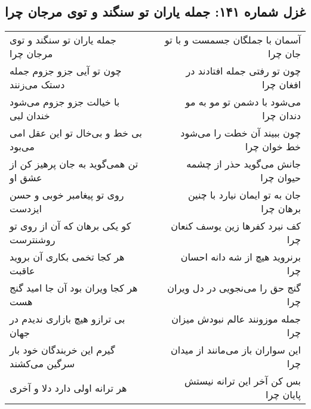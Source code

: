 \begin{center}
\section*{غزل شماره ۱۴۱: جمله یاران تو سنگند و توی مرجان چرا}
\label{sec:0141}
\begin{longtable}{l p{0.5cm} r}
جمله یاران تو سنگند و توی مرجان چرا
&&
آسمان با جملگان جسمست و با تو جان چرا
\\
چون تو آیی جزو جزوم جمله دستک می‌زنند
&&
چون تو رفتی جمله افتادند در افغان چرا
\\
با خیالت جزو جزوم می‌شود خندان لبی
&&
می‌شود با دشمن تو مو به مو دندان چرا
\\
بی خط و بی‌خال تو این عقل امی می‌بود
&&
چون ببیند آن خطت را می‌شود خط خوان چرا
\\
تن همی‌گوید به جان پرهیز کن از عشق او
&&
جانش می‌گوید حذر از چشمه حیوان چرا
\\
روی تو پیغامبر خوبی و حسن ایزدست
&&
جان به تو ایمان نیارد با چنین برهان چرا
\\
کو یکی برهان که آن از روی تو روشنترست
&&
کف نبرد کفرها زین یوسف کنعان چرا
\\
هر کجا تخمی بکاری آن بروید عاقبت
&&
برنروید هیچ از شه دانه احسان چرا
\\
هر کجا ویران بود آن جا امید گنج هست
&&
گنج حق را می‌نجویی در دل ویران چرا
\\
بی ترازو هیچ بازاری ندیدم در جهان
&&
جمله موزونند عالم نبودش میزان چرا
\\
گیرم این خربندگان خود بار سرگین می‌کشند
&&
این سواران باز می‌مانند از میدان چرا
\\
هر ترانه اولی دارد دلا و آخری
&&
بس کن آخر این ترانه نیستش پایان چرا
\\
\end{longtable}
\end{center}
